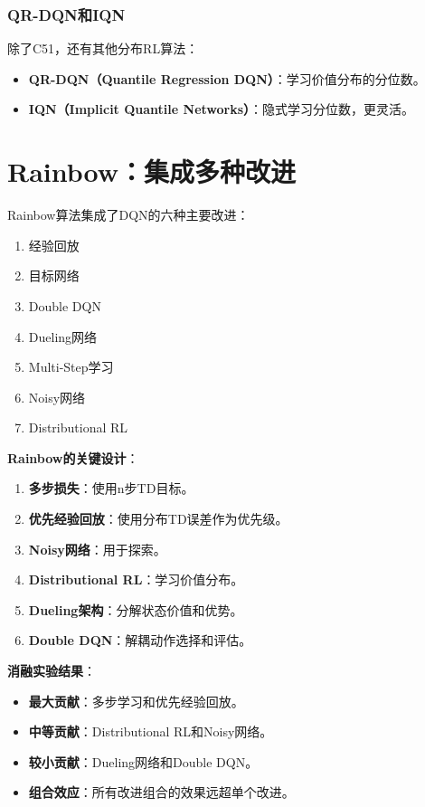 \subsubsection{QR-DQN和IQN}

除了C51，还有其他分布RL算法：
\begin{itemize}
    \item \textbf{QR-DQN（Quantile Regression DQN）}：学习价值分布的分位数。
    \item \textbf{IQN（Implicit Quantile Networks）}：隐式学习分位数，更灵活。
\end{itemize}

\section{Rainbow：集成多种改进}

Rainbow算法集成了DQN的六种主要改进：
\begin{enumerate}
    \item 经验回放
    \item 目标网络
    \item Double DQN
    \item Dueling网络
    \item Multi-Step学习
    \item Noisy网络
    \item Distributional RL
\end{enumerate}

\textbf{Rainbow的关键设计}：
\begin{enumerate}
    \item \textbf{多步损失}：使用n步TD目标。
    \item \textbf{优先经验回放}：使用分布TD误差作为优先级。
    \item \textbf{Noisy网络}：用于探索。
    \item \textbf{Distributional RL}：学习价值分布。
    \item \textbf{Dueling架构}：分解状态价值和优势。
    \item \textbf{Double DQN}：解耦动作选择和评估。
\end{enumerate}

\textbf{消融实验结果}：
\begin{itemize}
    \item \textbf{最大贡献}：多步学习和优先经验回放。
    \item \textbf{中等贡献}：Distributional RL和Noisy网络。
    \item \textbf{较小贡献}：Dueling网络和Double DQN。
    \item \textbf{组合效应}：所有改进组合的效果远超单个改进。
\end{itemize}

